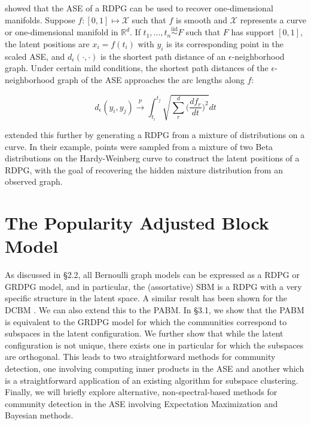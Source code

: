 \documentclass[
  11pt,
]{article}
\begin{document}
\citet{trosset2020learning} showed that the ASE of a RDPG can be used to
recover one-dimensional manifolds. Suppose
\(f : [0, 1] \mapsto \mathcal{X}\) such that \(f\) is smooth and
\(\mathcal{X}\) represents a curve or one-dimensional manifold in
\(\mathbb{R}^d\). If \(t_1, ..., t_n \stackrel{\text{iid}}{\sim}F\) such
that \(F\) has support \([0, 1]\), the latent positions are
\(x_i = f(t_i)\) with \(y_i\) is its corresponding point in the scaled
ASE, and \(d_{\epsilon}(\cdot, \cdot)\) is the shortest path distance of
an \(\epsilon\)-neighborhood graph. Under certain mild conditions, the
shortest path distances of the \(\epsilon\)-neighborhood graph of the
ASE approaches the arc lengths along \(f\):

\begin{equation}
d_{\epsilon}(y_i, y_j) \stackrel{p}{\to} \int_{t_i}^{t_j} \sqrt{\sum_r^d \Big( \frac{d f_r}{d t} \Big)^2} dt
\end{equation}

\citet{athreya2020estimation} extended this further by generating a RDPG
from a mixture of distributions on a curve. In their example, points
were sampled from a mixture of two Beta distributions on the
Hardy-Weinberg curve to construct the latent positions of a RDPG, with
the goal of recovering the hidden mixture distribution from an observed
graph.

\hypertarget{the-popularity-adjusted-block-model}{%
\section{The Popularity Adjusted Block
Model}\label{the-popularity-adjusted-block-model}}

As discussed in \S 2.2, all Bernoulli graph models can be expressed as a
RDPG or GRDPG model, and in particular, the (assortative) SBM is a RDPG
with a very specific structure in the latent space. A similar result has
been shown for the DCBM \cite{lyzinski2014}. We can also extend this to
the PABM. In \S 3.1, we show that the PABM is equivalent to the GRDPG
model for which the communities correspond to subspaces in the latent
configuration. We further show that while the latent configuration is
not unique, there exists one in particular for which the subspaces are
orthogonal. This leads to two straightforward methods for community
detection, one involving computing inner products in the ASE and another
which is a straightforward application of an existing algorithm for
subspace clustering. Finally, we will briefly explore alternative,
non-spectral-based methods for community detection in the ASE involving
Expectation Maximization and Bayesian methods.
\end{document}
